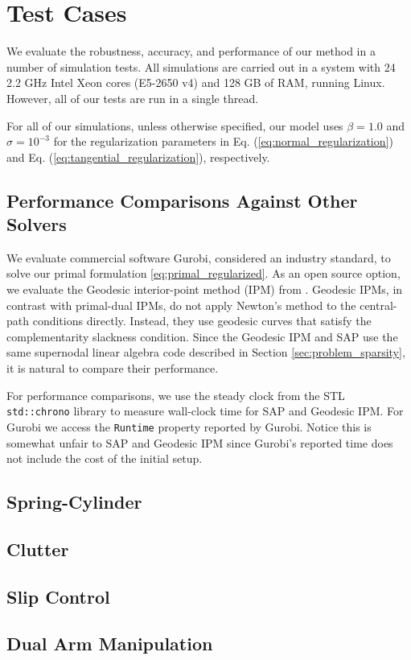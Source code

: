 \section{Test Cases}
\label{sec:test_cases}

We evaluate the robustness, accuracy, and performance of our method in a number
of simulation tests. All simulations are carried out in a system with 24 2.2 GHz
Intel Xeon cores (E5-2650 v4) and 128 GB of RAM, running Linux. However, all of
our tests are run in a single thread.

For all of our simulations, unless otherwise specified, our model uses
$\beta=1.0$ and $\sigma=10^{-3}$ for the regularization parameters in Eq.
(\ref{eq:normal_regularization}) and Eq. (\ref{eq:tangential_regularization}),
respectively.

\subsection{Performance Comparisons Against Other Solvers}
\label{sec:about_solvers}

We evaluate commercial software Gurobi, considered an industry standard, to
solve our primal formulation \eqref{eq:primal_regularized}. As an open source
option, we evaluate the Geodesic interior-point method (IPM) from
\cite{bib:permenter2020}. Geodesic IPMs, in contrast with primal-dual IPMs, do
not apply Newton's method to the central-path conditions directly. Instead, they
use geodesic curves that satisfy the complementarity slackness condition. Since
the Geodesic IPM and SAP use the same supernodal linear algebra code described
in Section \ref{sec:problem_sparsity}, it is natural to compare their
performance.

For performance comparisons, we use the steady clock from the STL
\verb+std::chrono+ library to measure wall-clock time for SAP and Geodesic IPM.
For Gurobi we access the \verb+Runtime+ property reported by Gurobi. Notice this
is somewhat unfair to SAP and Geodesic IPM since Gurobi's reported time does not
include the cost of the initial setup.

\subsection{Spring-Cylinder}
\label{sec:spring_cylinder}


\subsection{Clutter}
\label{sec:clutter}


\subsection{Slip Control}
\label{sec:slip_control}


\subsection{Dual Arm Manipulation}
\label{sec:dual_arm}

